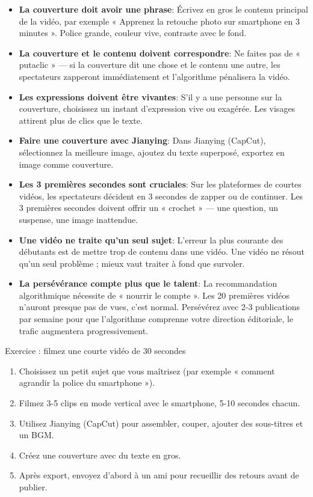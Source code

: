\begin{itemize}
  \item \textbf{La couverture doit avoir une phrase}: Écrivez en gros le contenu principal de la vidéo, par exemple « Apprenez la retouche photo sur smartphone en 3 minutes ». Police grande, couleur vive, contraste avec le fond.
  \item \textbf{La couverture et le contenu doivent correspondre}: Ne faites pas de « putaclic » — si la couverture dit une chose et le contenu une autre, les spectateurs zapperont immédiatement et l'algorithme pénalisera la vidéo.
  \item \textbf{Les expressions doivent être vivantes}: S'il y a une personne sur la couverture, choisissez un instant d'expression vive ou exagérée. Les visages attirent plus de clics que le texte.
  \item \textbf{Faire une couverture avec Jianying}: Dans Jianying (CapCut), sélectionnez la meilleure image, ajoutez du texte superposé, exportez en image comme couverture.
\end{itemize}


\begin{itemize}
  \item \textbf{Les 3 premières secondes sont cruciales}: Sur les plateformes de courtes vidéos, les spectateurs décident en 3 secondes de zapper ou de continuer. Les 3 premières secondes doivent offrir un « crochet » — une question, un suspense, une image inattendue.
  \item \textbf{Une vidéo ne traite qu'un seul sujet}: L'erreur la plus courante des débutants est de mettre trop de contenu dans une vidéo. Une vidéo ne résout qu'un seul problème ; mieux vaut traiter à fond que survoler.
  \item \textbf{La persévérance compte plus que le talent}: La recommandation algorithmique nécessite de « nourrir le compte ». Les 20 premières vidéos n'auront presque pas de vues, c'est normal. Persévérez avec 2-3 publications par semaine pour que l'algorithme comprenne votre direction éditoriale, le trafic augmentera progressivement.
\end{itemize}

\begin{tcbpractice}{Exercice : filmez une courte vidéo de 30 secondes}
\begin{enumerate}
  \item Choisissez un petit sujet que vous maîtrisez (par exemple « comment agrandir la police du smartphone »).
  \item Filmez 3-5 clips en mode vertical avec le smartphone, 5-10 secondes chacun.
  \item Utilisez Jianying (CapCut) pour assembler, couper, ajouter des sous-titres et un BGM.
  \item Créez une couverture avec du texte en gros.
  \item Après export, envoyez d'abord à un ami pour recueillir des retours avant de publier.
\end{enumerate}

\end{tcbpractice}

